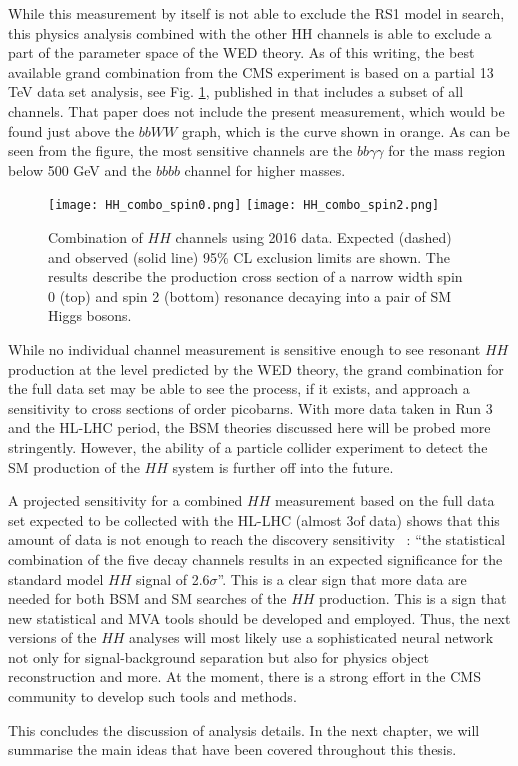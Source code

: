 While this measurement by itself is not able to exclude the RS1 model in search, this physics analysis combined with the other HH channels is able to exclude a part of the parameter space of the WED theory. As of this writing, the best available grand combination from the CMS experiment is based on a partial 13 TeV data set analysis, see Fig. \ref{HH_combo}, published in \cite{HH_combo} that includes a subset of all channels. That paper does not include the present measurement, which would be found just above the $bbWW$ graph, which is the curve shown in orange. As can be seen from the figure, the most sensitive channels are the $bb\gamma\gamma$ for the mass region below 500 GeV and the $bbbb$ channel for higher masses.

\begin{figure}[H]%
\begin{center}
\texttt{[image: HH\_combo\_spin0.png]}
\texttt{[image: HH\_combo\_spin2.png]}
\caption[Combination of $HH$ channels using 2016 data.]{Combination of $HH$ channels using 2016 data. Expected (dashed) and observed (solid line) 95\% CL exclusion limits are shown. The results describe the production cross section of a narrow width spin 0 (top) and spin 2 (bottom) resonance decaying into a pair of SM Higgs bosons. }
\label{HH_combo}
\end{center}
\end{figure}

While no individual channel measurement is sensitive enough to see resonant $HH$ production at the level predicted by the WED theory, the grand combination for the full data set may be able to see the process, if it exists, and approach a sensitivity to cross sections of order picobarns. With more data taken in Run 3 and the HL-LHC period, the BSM theories discussed here will be probed more stringently. However, the ability of a particle collider experiment to detect the SM production of the $HH$ system is further off into the future.

A projected sensitivity for a combined $HH$ measurement based on the full data set expected to be collected with the HL-LHC (almost 3\abinv of data) shows that this amount of data is not enough to reach the discovery sensitivity ~\cite{CMS-PAS-FTR-18-019}: ``the statistical combination of the five decay channels results in an expected significance for the standard model $HH$ signal of 2.6$\sigma$''. This is a clear sign that more data are needed for both BSM and SM searches of the $HH$ production. This is a sign that new statistical and MVA tools should be developed and employed. Thus, the next versions of the $HH$ analyses will most likely use a sophisticated neural network not only for signal-background separation but also for physics object reconstruction and more. At the moment, there is a strong effort in the CMS community to develop such tools and methods. 

This concludes the discussion of analysis details. In the next chapter, we will summarise the main ideas that have been covered throughout this thesis. 




